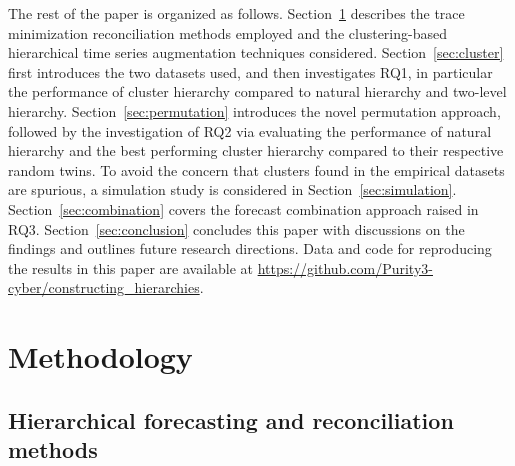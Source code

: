 \documentclass[a4paper,review,12pt,authoryear]{elsarticle}
\begin{document}
The rest of the paper is organized as follows. Section~\ref{sec:methodology} describes the trace minimization reconciliation methods employed and the clustering-based hierarchical time series augmentation techniques considered. Section~\ref{sec:cluster} first introduces the two datasets used, and then investigates RQ1, in particular the performance of cluster hierarchy compared to natural hierarchy and two-level hierarchy. Section~\ref{sec:permutation} introduces the novel permutation approach, followed by the investigation of RQ2 via evaluating the performance of natural hierarchy and the best performing cluster hierarchy compared to their respective random twins. To avoid the concern that clusters found in the empirical datasets are spurious, a simulation study is considered in Section~\ref{sec:simulation}. Section~\ref{sec:combination} covers the forecast combination approach raised in RQ3. Section~\ref{sec:conclusion} concludes this paper with discussions on the findings and outlines future research directions. 
Data and code for reproducing the results in this paper are available at \url{https://github.com/Purity3-cyber/constructing_hierarchies}.



\section{Methodology}\label{sec:methodology}

\subsection{Hierarchical forecasting and reconciliation methods}

\end{document}

